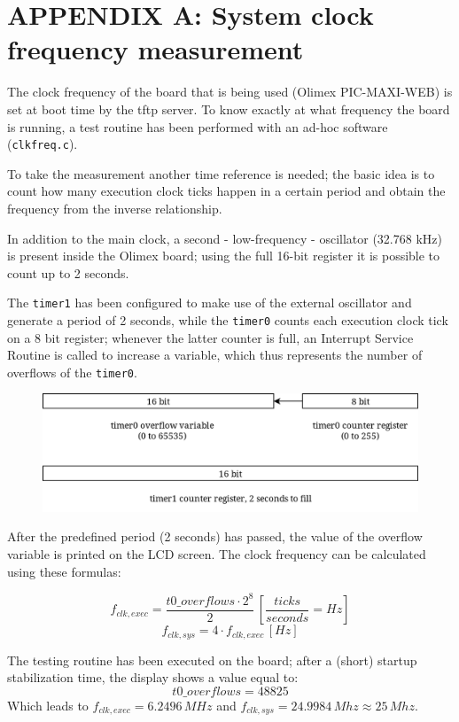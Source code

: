 \section*{APPENDIX A: System clock frequency measurement}
The clock frequency of the board that is being used (Olimex PIC-MAXI-WEB) is set at boot time by the tftp server. To know exactly at what frequency the board is running, a test routine has been performed with an ad-hoc software (\texttt{clkfreq.c}).

To take the measurement another time reference is needed; the basic idea is to count how many execution clock ticks happen in a certain period and obtain the frequency from the inverse relationship.

In addition to the main clock, a second - low-frequency - oscillator (32.768 kHz) is present inside the Olimex board; using the full 16-bit register it is possible to count up to 2 seconds.

The \texttt{timer1} has been configured to make use of the external oscillator and generate a period of 2 seconds, while the \texttt{timer0} counts each execution clock tick on a 8 bit register; whenever the latter counter is full, an Interrupt Service Routine is called to increase a variable, which thus represents the number of overflows of the \texttt{timer0}.\\

\begin{figure}[h]
	\centering
	\includegraphics[width=0.7\linewidth]{images/timers}
	\label{fig:timers}
\end{figure}

After the predefined period (2 seconds) has passed, the value of the overflow variable is printed on the LCD screen. The clock frequency can be calculated using these formulas:

$$ f_{clk,exec} = \frac{t0\_overflows \cdot 2^8}{2}\, \left[{\frac{ticks}{seconds} = Hz}\right]$$
$$ f_{clk,sys} = 4 \cdot f_{clk,exec}\,\left[Hz\right] $$

The testing routine has been executed on the board; after a (short) startup stabilization time, the display shows a value equal to:
$$ t0\_overflows = 48825 $$
Which leads to $f_{clk,exec} = 6.2496\,MHz$ and $f_{clk,sys} = 24.9984\,Mhz \approx 25\,Mhz$.\\

